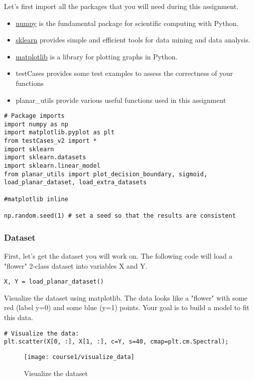 Let's first import all the packages that you will need during this assignment.
\begin{itemize}
\item \href{http://www.numpy.org/}{numpy} is the fundamental package for scientific computing with Python.
\item \href{http://scikit-learn.org/stable/}{sklearn} provides simple and efficient tools for data mining and data analysis.
\item \href{https://matplotlib.org/}{matplotlib} is a library for plotting graphs in Python.
\item testCases provides some test examples to assess the correctness of your functions
\item planar\_utils provide various useful functions used in this assignment
\end{itemize}

\begin{verbatim}
# Package imports
import numpy as np
import matplotlib.pyplot as plt
from testCases_v2 import *
import sklearn
import sklearn.datasets
import sklearn.linear_model
from planar_utils import plot_decision_boundary, sigmoid, load_planar_dataset, load_extra_datasets

#matplotlib inline

np.random.seed(1) # set a seed so that the results are consistent
\end{verbatim}

\subsubsection{Dataset}

First, let's get the dataset you will work on. The following code will load a "flower" 2-class dataset into variables X and Y.
\begin{verbatim}
X, Y = load_planar_dataset()
\end{verbatim}

Visualize the dataset using matplotlib. The data looks like a "flower" with some red (label y=0) and some blue (y=1) points. Your goal is to build a model to fit this data.
\begin{verbatim}
# Visualize the data:
plt.scatter(X[0, :], X[1, :], c=Y, s=40, cmap=plt.cm.Spectral);
\end{verbatim}

\begin{figure}[h]
\begin{center}
\texttt{[image: course1/visualize\_data]}
\end{center}
\caption{Visualize the dataset}
\label{fig:visualize_data}
\end{figure}


